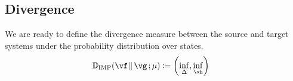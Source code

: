 \documentclass[a4paper,twoside]{article}
\newcounter{ct}
\newcommand{\divv}{\ensuremath{\mathbb{D}}}
\newcommand{\IMPdivv}[3]{\divv_{\text{IMP}}\!\left({#1}\middle\lvert\middle\rvert\,{#2}\,;{#3}\right)}
\newcommand{\homeo}{\vh}
\begin{document}
\subsection{Divergence}
We are ready to define the divergence measure between the source and target systems under the probability distribution over states.
\begin{align}\label{eq:divergence}
    \IMPdivv{\vf}{\vg}{\mu}
	&\coloneqq
	\left(
	\inf_\Delta
	,
	\inf_\homeo
	\right)
\end{align}



\end{document}
